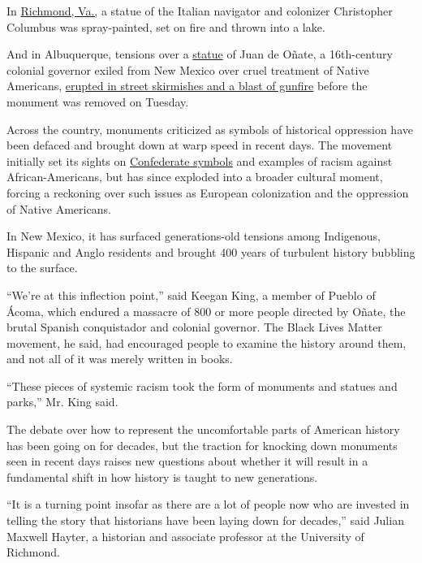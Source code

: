 In
\href{https://www.nytimes3xbfgragh.onion/2020/06/10/us/christopher-columbus-statue-boston-richmond.html}{Richmond,
Va.,} a statue of the Italian navigator and colonizer Christopher
Columbus was spray-painted, set on fire and thrown into a lake.

And in Albuquerque, tensions over a
\href{https://www.nytimes3xbfgragh.onion/2020/07/15/world/europe/bristol-statue-black-lives-matter.html}{statue}
of Juan de Oñate, a 16th-century colonial governor exiled from New
Mexico over cruel treatment of Native Americans,
\href{https://www.nytimes3xbfgragh.onion/2020/06/15/us/conquistador-onate-albuquerque-new-mexico-unrest.html}{erupted
in street skirmishes and a blast of gunfire} before the monument was
removed on Tuesday.

Across the country, monuments criticized as symbols of historical
oppression have been defaced and brought down at warp speed in recent
days. The movement initially set its sights on
\href{https://www.nytimes3xbfgragh.onion/2020/06/23/style/statue-richmond-lee.html}{Confederate
symbols} and examples of racism against African-Americans, but has since
exploded into a broader cultural moment, forcing a reckoning over such
issues as European colonization and the oppression of Native Americans.

In New Mexico, it has surfaced generations-old tensions among
Indigenous, Hispanic and Anglo residents and brought 400 years of
turbulent history bubbling to the surface.

``We're at this inflection point,'' said Keegan King, a member of Pueblo
of Ácoma, which endured a massacre of 800 or more people directed by
Oñate, the brutal Spanish conquistador and colonial governor. The Black
Lives Matter movement, he said, had encouraged people to examine the
history around them, and not all of it was merely written in books.

``These pieces of systemic racism took the form of monuments and statues
and parks,'' Mr. King said.

The debate over how to represent the uncomfortable parts of American
history has been going on for decades, but the traction for knocking
down monuments seen in recent days raises new questions about whether it
will result in a fundamental shift in how history is taught to new
generations.

``It is a turning point insofar as there are a lot of people now who are
invested in telling the story that historians have been laying down for
decades,'' said Julian Maxwell Hayter, a historian and associate
professor at the University of Richmond.

